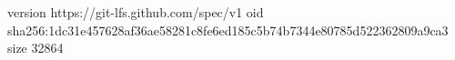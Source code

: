 version https://git-lfs.github.com/spec/v1
oid sha256:1dc31e457628af36ae58281c8fe6ed185c5b74b7344e80785d522362809a9ca3
size 32864
